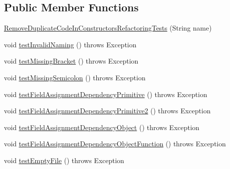 \subsection*{Public Member Functions}
\begin{DoxyCompactItemize}
\item 
\hyperlink{classedu_1_1illinois_1_1canistelCassabanana_1_1tests_1_1RemoveDuplicateCodeInConstructorsRefactoringTests_ade9db394415373c643268437e7c8abb0}{RemoveDuplicateCodeInConstructorsRefactoringTests} (String name)
\item 
void \hyperlink{classedu_1_1illinois_1_1canistelCassabanana_1_1tests_1_1RemoveDuplicateCodeInConstructorsRefactoringTests_a1b59306010bf23a70f306598952f49d5}{testInvalidNaming} ()  throws Exception 
\item 
void \hyperlink{classedu_1_1illinois_1_1canistelCassabanana_1_1tests_1_1RemoveDuplicateCodeInConstructorsRefactoringTests_a9e42bf5e1bae5f24afe8fe8b12c5b0e5}{testMissingBracket} ()  throws Exception 
\item 
void \hyperlink{classedu_1_1illinois_1_1canistelCassabanana_1_1tests_1_1RemoveDuplicateCodeInConstructorsRefactoringTests_a46aca0909bcf32882ed69af631b83dfa}{testMissingSemicolon} ()  throws Exception 
\item 
void \hyperlink{classedu_1_1illinois_1_1canistelCassabanana_1_1tests_1_1RemoveDuplicateCodeInConstructorsRefactoringTests_aa6e02bbd144ccd71c95223ac9ab237b7}{testFieldAssignmentDependencyPrimitive} ()  throws Exception 
\item 
void \hyperlink{classedu_1_1illinois_1_1canistelCassabanana_1_1tests_1_1RemoveDuplicateCodeInConstructorsRefactoringTests_a025734c047b6b92e487f92c4977c81b6}{testFieldAssignmentDependencyPrimitive2} ()  throws Exception 
\item 
void \hyperlink{classedu_1_1illinois_1_1canistelCassabanana_1_1tests_1_1RemoveDuplicateCodeInConstructorsRefactoringTests_a14bf2aac6b96539d29e6c5c582265ebe}{testFieldAssignmentDependencyObject} ()  throws Exception 
\item 
void \hyperlink{classedu_1_1illinois_1_1canistelCassabanana_1_1tests_1_1RemoveDuplicateCodeInConstructorsRefactoringTests_a5993441971ce208a3e0a99853169da24}{testFieldAssignmentDependencyObjectFunction} ()  throws Exception 
\item 
void \hyperlink{classedu_1_1illinois_1_1canistelCassabanana_1_1tests_1_1RemoveDuplicateCodeInConstructorsRefactoringTests_a6a874baa9f9b327abe88b9a599f1a46d}{testEmptyFile} ()  throws Exception 
\item 

\end{DoxyCompactItemize}
